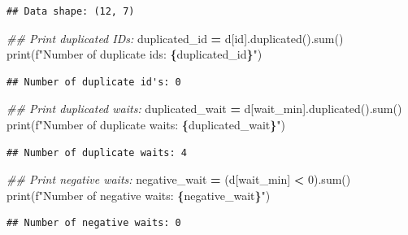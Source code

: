 \documentclass[
]{article}
\newenvironment{Shaded}{\begin{snugshade}}{\end{snugshade}}
\newcommand{\BuiltInTok}[1]{#1}
\newcommand{\CommentTok}[1]{\textcolor[rgb]{0.56,0.35,0.01}{\textit{#1}}}
\newcommand{\DecValTok}[1]{\textcolor[rgb]{0.00,0.00,0.81}{#1}}
\newcommand{\NormalTok}[1]{#1}
\newcommand{\OperatorTok}[1]{\textcolor[rgb]{0.81,0.36,0.00}{\textbf{#1}}}
\newcommand{\SpecialCharTok}[1]{\textcolor[rgb]{0.81,0.36,0.00}{\textbf{#1}}}
\newcommand{\SpecialStringTok}[1]{\textcolor[rgb]{0.31,0.60,0.02}{#1}}
\newcommand{\StringTok}[1]{\textcolor[rgb]{0.31,0.60,0.02}{#1}}
\begin{document}
\begin{verbatim}
## Data shape: (12, 7)
\end{verbatim}

\begin{Shaded}
\begin{Highlighting}[]
\CommentTok{\#\# Print duplicated ID\textquotesingle{}s:}
\NormalTok{duplicated\_id }\OperatorTok{=}\NormalTok{ d[}\StringTok{\textquotesingle{}id\textquotesingle{}}\NormalTok{].duplicated().}\BuiltInTok{sum}\NormalTok{()}
\BuiltInTok{print}\NormalTok{(}\SpecialStringTok{f"Number of duplicate id\textquotesingle{}s: }\SpecialCharTok{\{}\NormalTok{duplicated\_id}\SpecialCharTok{\}}\SpecialStringTok{"}\NormalTok{)}
\end{Highlighting}
\end{Shaded}

\begin{verbatim}
## Number of duplicate id's: 0
\end{verbatim}

\begin{Shaded}
\begin{Highlighting}[]
\CommentTok{\#\# Print duplicated waits:}
\NormalTok{duplicated\_wait }\OperatorTok{=}\NormalTok{ d[}\StringTok{\textquotesingle{}wait\_min\textquotesingle{}}\NormalTok{].duplicated().}\BuiltInTok{sum}\NormalTok{()}
\BuiltInTok{print}\NormalTok{(}\SpecialStringTok{f"Number of duplicate waits: }\SpecialCharTok{\{}\NormalTok{duplicated\_wait}\SpecialCharTok{\}}\SpecialStringTok{"}\NormalTok{)}
\end{Highlighting}
\end{Shaded}

\begin{verbatim}
## Number of duplicate waits: 4
\end{verbatim}

\begin{Shaded}
\begin{Highlighting}[]
\CommentTok{\#\# Print negative waits:}
\NormalTok{negative\_wait }\OperatorTok{=}\NormalTok{ (d[}\StringTok{\textquotesingle{}wait\_min\textquotesingle{}}\NormalTok{] }\OperatorTok{\textless{}} \DecValTok{0}\NormalTok{).}\BuiltInTok{sum}\NormalTok{()}
\BuiltInTok{print}\NormalTok{(}\SpecialStringTok{f"Number of negative waits: }\SpecialCharTok{\{}\NormalTok{negative\_wait}\SpecialCharTok{\}}\SpecialStringTok{"}\NormalTok{)}
\end{Highlighting}
\end{Shaded}

\begin{verbatim}
## Number of negative waits: 0
\end{verbatim}
\end{document}
